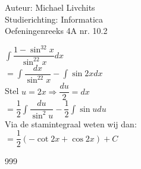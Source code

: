 \documentclass[a4paper]{article}
\begin{document}
  
\noindent \large Auteur: Michael Livchits \\
\noindent \large Studierichting: Informatica\\
\noindent \large Oefeningenreeks 4A nr. 10.2\\

\medskip

\normalsize

$\displaystyle\int\dfrac{1-\sin^32x}{\sin^22x}dx$\\

$= \displaystyle\int\dfrac{dx}{\sin^22x} - \displaystyle\int\sin2xdx$\\

Stel $u = 2x\Rightarrow \dfrac{du}{2} =  dx$\\

$= \displaystyle\dfrac{1}{2}\int\dfrac{du}{\sin^2u} - \dfrac{1}{2}\displaystyle\int\sin udu$\\

Via de stamintegraal weten wij dan:\\

$= \dfrac{1}{2}\left(-\cot 2x +\cos 2x\right) + C$\\

\begin{thebibliography}{999}
\end{thebibliography}
\end{document}
